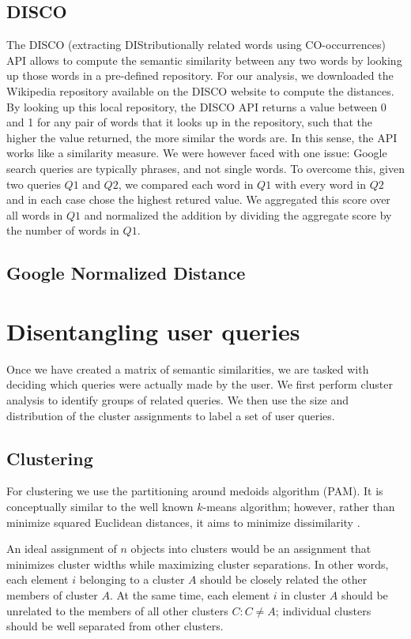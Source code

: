 \documentclass[11pt]{article}
\begin{document}
\begin{multicols}{2}
\subsection{DISCO}
\label{sec:disco}
The DISCO (extracting DIStributionally related words using CO-occurrences) API allows to compute the semantic similarity between any two words by looking up those words in a pre-defined repository. For our analysis, we downloaded the Wikipedia repository available on the DISCO website to compute the distances. By looking up this local repository, the DISCO API returns a value between 0 and 1 for any pair of words that it looks up in the repository, such that the higher the value returned, the more similar the words are. In this sense, the API works like a similarity measure. We were however faced with one issue: Google search queries are typically phrases, and not single words. To overcome this, given two queries $Q1$ and $Q2$, we compared each word in $Q1$ with every word in $Q2$ and in each case chose the highest retured value. We aggregated this score over all words in $Q1$ and normalized the addition by dividing the aggregate score by the number of words in $Q1$.

\subsection{Google Normalized Distance}
\label{sec:gnd}

\section{Disentangling user queries}
\label{sec:disentangle}
Once we have created a matrix of semantic similarities, we are tasked
with deciding which queries were actually made by the user. We first
perform cluster analysis to identify groups of related queries. We
then use the size and distribution of the cluster assignments to label a
set of user queries.

\subsection{Clustering}
\label{sec:clustering}
For clustering we use the partitioning around medoids algorithm
(PAM). It is conceptually similar to the well known $k$-means
algorithm; however, rather than minimize squared Euclidean distances,
it aims to minimize dissimilarity \cite{Kaufmann1990}. 

An ideal assignment of $n$ objects into clusters would be an assignment that minimizes cluster widths while maximizing cluster separations. In other words, each element $i$ belonging to a cluster $A$ should be closely related the other members of cluster $A$. At the same time, each element $i$ in cluster $A$ should be unrelated to the members of all other clusters $C : C \neq A$; individual clusters should be well separated from other clusters.


\end{multicols}
\end{document}
